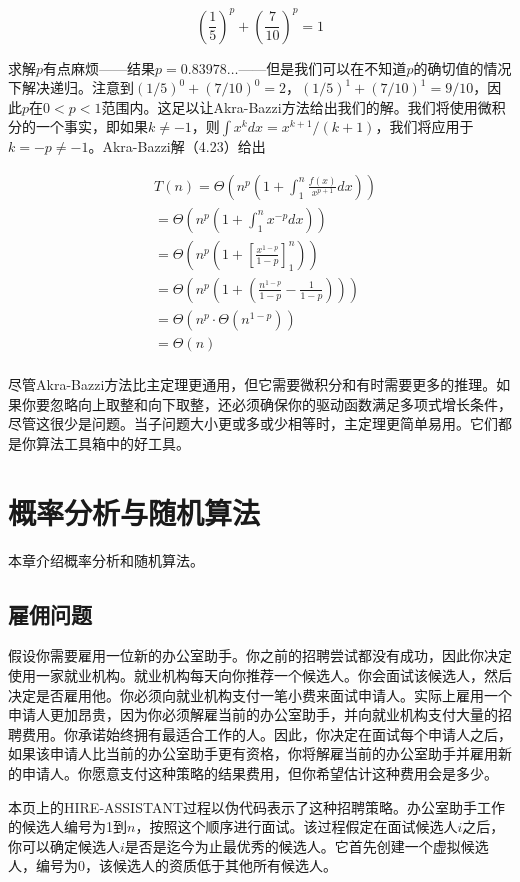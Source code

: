 \documentclass[lang=cn,newtx,10pt,scheme=chinese]{elegantbook}
\begin{document}
$$
(\frac{1}{5})^p+(\frac{7}{10})^p=1
$$

求解$p$有点麻烦——结果$p=0.83978 \ldots$——但是我们可以在不知道$p$的确切值的情况下解决递归。注意到$(1 / 5)^0+(7 / 10)^0=2$，$(1 / 5)^1+(7 / 10)^1=9 / 10$，因此$p$在$0<p<1$范围内。这足以让Akra-Bazzi方法给出我们的解。我们将使用微积分的一个事实，即如果$k \neq-1$，则$\int x^k d x=x^{k+1} /(k+1)$，我们将应用于$k=-p \neq-1$。Akra-Bazzi解（4.23）给出

$$
\begin{aligned}
& T(n)=\Theta(n^p(1+\int_1^n \frac{f(x)}{x^{p+1}} d x)) \\
& =\Theta(n^p(1+\int_1^n x^{-p} d x)) \\
& =\Theta(n^p(1+[\frac{x^{1-p}}{1-p}]_1^n)) \\
& =\Theta(n^p(1+(\frac{n^{1-p}}{1-p}-\frac{1}{1-p}))) \\
& =\Theta(n^p \cdot \Theta(n^{1-p})) \\
& =\Theta(n) \\
&
\end{aligned}
$$

尽管Akra-Bazzi方法比主定理更通用，但它需要微积分和有时需要更多的推理。如果你要忽略向上取整和向下取整，还必须确保你的驱动函数满足多项式增长条件，尽管这很少是问题。当子问题大小更或多或少相等时，主定理更简单易用。它们都是你算法工具箱中的好工具。

\chapter{概率分析与随机算法}\label{chapter-05}

本章介绍概率分析和随机算法。

\section{雇佣问题}\label{section-5.1}

假设你需要雇用一位新的办公室助手。你之前的招聘尝试都没有成功，因此你决定使用一家就业机构。就业机构每天向你推荐一个候选人。你会面试该候选人，然后决定是否雇用他。你必须向就业机构支付一笔小费来面试申请人。实际上雇用一个申请人更加昂贵，因为你必须解雇当前的办公室助手，并向就业机构支付大量的招聘费用。你承诺始终拥有最适合工作的人。因此，你决定在面试每个申请人之后，如果该申请人比当前的办公室助手更有资格，你将解雇当前的办公室助手并雇用新的申请人。你愿意支付这种策略的结果费用，但你希望估计这种费用会是多少。

本页上的HIRE-ASSISTANT过程以伪代码表示了这种招聘策略。办公室助手工作的候选人编号为1到$n$，按照这个顺序进行面试。该过程假定在面试候选人$i$之后，你可以确定候选人$i$是否是迄今为止最优秀的候选人。它首先创建一个虚拟候选人，编号为0，该候选人的资质低于其他所有候选人。
\end{document}
